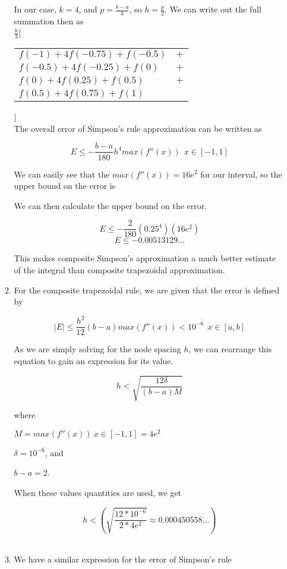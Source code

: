 \documentclass[11pt]{article}
\begin{document}
\begin{enumerate}
\begin{enumerate}
		In our case, $k = 4$, and $p = \frac{b-a}{k}$, so $h = \frac{p}{2}$. We can write out the full summation then as \\

		$\frac{h}{3}$[
		\begin{tabular}{ll}
			$f(-1) + 4f(-0.75) + f(-0.5)$ & $+$ \\
			$f(-0.5) + 4f(-0.25) + f(0)$ & $+$ \\
			$f(0) + 4f(0.25) + f(0.5)$ & $+$ \\
			$f(0.5) + 4f(0.75) + f(1)$
		\end{tabular}
		] \\

		The overall error of Simpson's rule approximation can be written as

		\[
		E \leq -\frac{b-a}{180}h^4max(f''(x))\ \ x\in[-1,1]
		\]

		We can easily see that the $max(f''(x)) = 16e^2$ for our interval, so the upper bound on the error is

		We can then calculate the upper bound on the error.

		\[
		E \leq -\frac{2}{180}(0.25^4)(16e^2)
		\]
		\[
		E \leq -0.00513129\ldots
		\]

		This makes composite Simpson's approximation a much better estimate of the integral than composite trapezoidal approximation. \\

		\item For the composite trapezoidal rule, we are given that the error is defined by

		\[
		|E| \leq \frac{h^2}{12} (b-a) max(f''(x)) < 10^{-6}\ \ x\in[a,b]
		\]

		As we are simply solving for the node spacing $h$, we can rearrange this equation to gain an expression for its value.

		\[
		h  < \sqrt{\frac{12\delta}{(b-a)M}}
		\]

		where

		$M=max(f''(x))\ x\in[-1,1] = 4e^2$

		$\delta=10^{-6}$, and

		$b-a=2$.

		When these values quantities are used, we get

		\[
		h < (\sqrt{\frac{12*10^{-6}}{2*4e^2}} \approx 0.000450558\ldots)
		\] \

		\item We have a similar expression for the error of Simpson's rule


\end{enumerate}
\end{enumerate}
\end{document}
